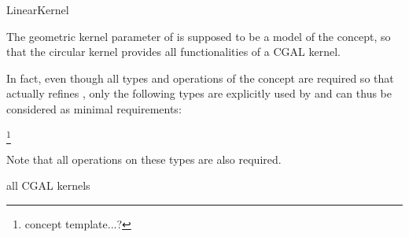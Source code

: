 \begin{ccRefConcept}{LinearKernel} 

\ccDefinition

The geometric kernel parameter of  is
supposed to be a model of the  concept, so that the
circular kernel provides all functionalities of a CGAL kernel.  

In fact, even though all types and operations of the
 concept are required so that
 actually refines , only
the following types are explicitly used by  and
can thus be considered as minimal requirements:

 \footnote{concept template...?}


Note that all operations on these types are also required.

\ccHasModels

all CGAL kernels

\ccSeeAlso


\end{ccRefConcept}
